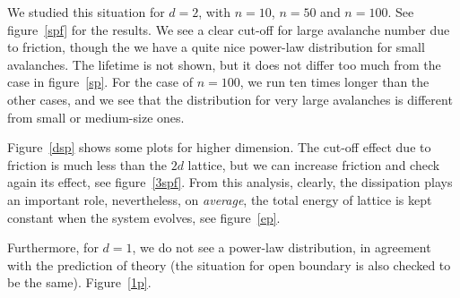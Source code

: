 We studied this situation for $d=2$, with $n=10$, $n=50$ and $n=100$. See figure~\ref{spf} for the results. 
We see a clear cut-off for large avalanche number due to friction, though the we have a quite nice power-law distribution for small avalanches.
The lifetime is not shown, but it does not differ too much from the case in figure~\ref{sp}.
For the case of $n=100$, we run ten times longer than the other cases, and we see that the distribution for very large avalanches is different from small or medium-size ones. 



Figure~\ref{dsp} shows some plots for higher dimension. The cut-off effect due to friction is much less than the $2d$ lattice, 
but we can increase friction and check again its effect, see figure~\ref{3spf}.
From this analysis, clearly, the dissipation plays an important role, nevertheless, on \emph{average}, 
the total energy of lattice is kept constant when the system evolves, see figure~\ref{ep}. 

Furthermore, for $d=1$, we do not see a power-law distribution, in agreement with the prediction of theory (the situation for open boundary is also checked to be the same). Figure~\ref{1p}. 


